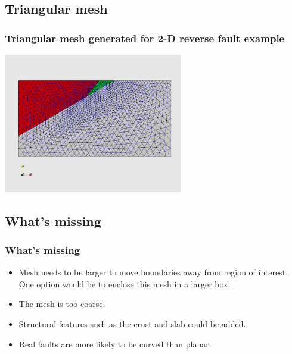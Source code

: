 \documentclass[aspectratio=169]{beamer}
\begin{document}
\subsection{Triangular mesh}

\begin{frame}
  \frametitle{Triangular mesh generated for 2-D reverse fault example}
 
  \vfill
  \begin{center}
    \includegraphics[height=6.1cm]{figs/reverse_trimesh}
  \end{center}
  \vfill
 
\end{frame}


\subsection{What's missing}

\begin{frame}
  \frametitle{What's missing}
  
  \begin{itemize}
  \item Mesh needs to be larger to move boundaries away from region of
    interest. One option would be to enclose this mesh in a larger
    box.
  \item The mesh is too coarse.
  \item Structural features such as the crust and slab could be added.
  \item Real faults are more likely to be curved than planar.
  \end{itemize}

\end{frame}



\end{document}
